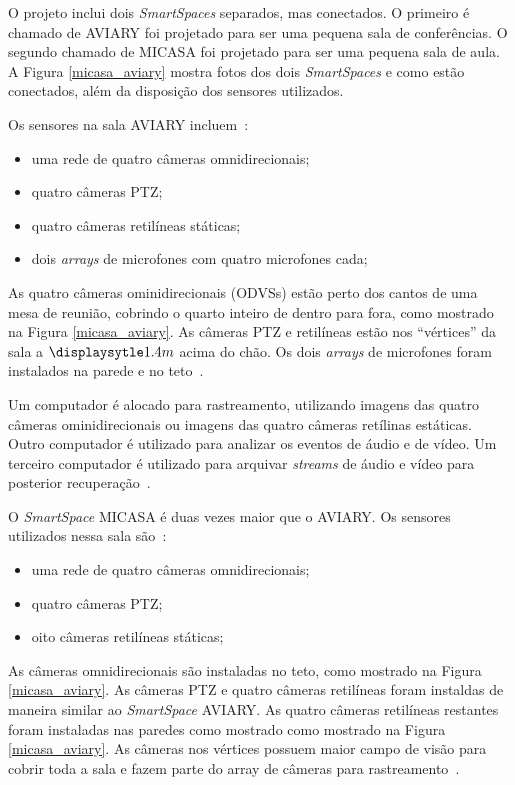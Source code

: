 O projeto inclui dois \textit{SmartSpaces} separados, mas conectados. O primeiro é chamado de AVIARY foi projetado para ser uma pequena sala de conferências. O segundo chamado de MICASA foi projetado para ser uma pequena sala de aula. A Figura \ref{micasa_aviary} mostra fotos dos dois \textit{SmartSpaces} e como estão conectados, além da disposição dos sensores utilizados.

Os sensores na sala AVIARY incluem~\cite{trivedi}:

	\begin{itemize}
		\item uma rede de quatro câmeras omnidirecionais;
		\item quatro câmeras PTZ;
		\item quatro câmeras retilíneas státicas;
		\item dois \textit{arrays} de microfones com quatro microfones cada;
	\end{itemize}

As quatro câmeras ominidirecionais (ODVSs) estão perto dos cantos de uma mesa de reunião, cobrindo o quarto inteiro de dentro para fora, como mostrado na Figura \ref{micasa_aviary}. As câmeras PTZ e retilíneas estão nos ``vértices'' da sala a $\displaysytle 1.4m$ acima do chão. Os dois \textit{arrays} de microfones foram instalados na parede e no teto~\cite{trivedi}.

Um computador é alocado para rastreamento, utilizando imagens das quatro câmeras ominidirecionais ou imagens das quatro câmeras retílinas estáticas. Outro computador é utilizado para analizar os eventos de áudio e de vídeo. Um terceiro computador é utilizado para arquivar \textit{streams} de áudio e vídeo para posterior recuperação~\cite{trivedi}.

O \textit{SmartSpace} MICASA é duas vezes maior que o AVIARY. Os sensores utilizados nessa sala são~\cite{trivedi}:
	
	\begin{itemize}
		\item uma rede de quatro câmeras omnidirecionais;
		\item quatro câmeras PTZ;
		\item oito câmeras retilíneas státicas;
	\end{itemize}

As câmeras omnidirecionais são instaladas no teto, como mostrado na Figura \ref{micasa_aviary}. As câmeras PTZ e quatro câmeras retilíneas foram instaldas de maneira similar ao \textit{SmartSpace} AVIARY. As quatro câmeras retilíneas restantes foram instaladas nas paredes como mostrado como mostrado na Figura \ref{micasa_aviary}. As câmeras nos vértices possuem maior campo de visão para cobrir toda a sala e fazem parte do array de câmeras para rastreamento~\cite{trivedi}.

